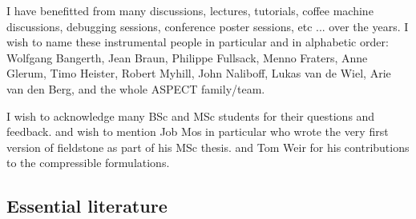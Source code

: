 \documentclass[a4paper]{article}
\begin{document}
I have benefitted from many discussions, lectures, tutorials, coffee machine 
discussions, debugging sessions, conference poster sessions, etc ... 
over the years. I wish to name these instrumental people in particular and 
in alphabetic order: 
Wolfgang Bangerth, 
Jean Braun, 
Philippe Fullsack, 
Menno Fraters, 
Anne Glerum,
Timo Heister,
Robert Myhill,
John Naliboff,
Lukas van de Wiel,
Arie van den Berg, and the whole ASPECT family/team. 

I wish to acknowledge many BSc and MSc students for their questions and feedback.
and wish to mention Job Mos in particular who wrote the
very first version of fieldstone as part of his MSc thesis.
and Tom Weir for his contributions to the compressible formulations.



\subsection{Essential literature} %
\end{document}

